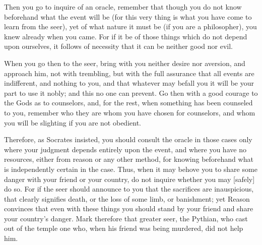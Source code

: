 Then you  go to  inquire of  an oracle, remember  that though  you do  not know
beforehand what the event will be (for this very thing is what you have come to
learn from the seer), yet of what nature it must be (if you are a philosopher),
you knew  already when  you came. For  if it  be of those  things which  do not
depend upon ourselves, it follows of necessity  that it can be neither good nor
evil.

When you go then  to the seer, bring with you neither  desire nor aversion, and
approach him, not  with trembling, but with the full  assurance that all events
are indifferent, and nothing  to you, and that whatever may  befall you it will
be your part to use it nobly; and this  no one can prevent. Go then with a good
courage to  the Gods as  to counselors, and, for  the rest, when  something has
been  counseled  to  you, remember  who  they  are  whom  you have  chosen  for
counselors, and whom you will be slighting if you are not obedient.

Therefore, as Socrates  insisted, you should consult the oracle  in those cases
only where your judgment depends entirely upon the event, and where you have no
resources, either from reason or any  other method, for knowing beforehand what
is independently  certain in the  case. Thus, when it  may behove you  to share
some danger with  your friend or your  country, do not inquire  whether you may
[safely] do so. For if the seer  should announce to you that the sacrifices are
inauspicious,  that clearly  signifies  death, or  the loss  of  some limb,  or
banishment; yet Reason  convinces that even with these things  you should stand
by your  friend and share  your country's  danger. Mark therefore  that greater
seer, the  Pythian, who cast  out of  the temple one  who, when his  friend was
being murdered, did not help him.
